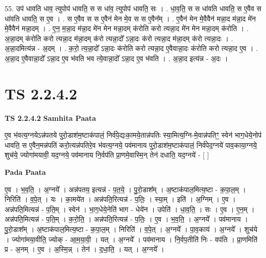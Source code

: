 \documentclass[17pt]{extarticle}
\begin{document}
55. उप॑ धावति धाव॒ त्युपोप॑ धावति॒ स स धा॑व॒ त्युपोप॑ धावति॒ सः । . धा॒व॒ति॒ स स धा॑वति धावति॒ स ए॒वैव स धा॑वति धावति॒ स ए॒व । . स ए॒वैव स स ए॒वैन॑ मेन मे॒व स स ए॒वैन᳚म् । . ए॒वैन॑ मेन मे॒वैवैन॑ मन्ना॒द म॑न्ना॒द मे॑न मे॒वैवैन॑ मन्ना॒दम् । . ए॒न॒ म॒न्ना॒द म॑न्ना॒द मे॑न मेन मन्ना॒दम् क॑रोति करो त्यन्ना॒द मे॑न मेन मन्ना॒दम् क॑रोति । . अ॒न्ना॒दम् क॑रोति करो त्यन्ना॒द म॑न्ना॒दम् क॑रो त्यन्ना॒दो᳚ ऽन्ना॒दः क॑रो त्यन्ना॒द म॑न्ना॒दम् क॑रो त्यन्ना॒दः । . अ॒न्ना॒दमित्य॑न्न - अ॒दम् । . क॒रो॒ त्य॒न्ना॒दो᳚ ऽन्ना॒दः क॑रोति करो त्यन्ना॒द ए॒वैवान्ना॒दः क॑रोति करो त्यन्ना॒द ए॒व । . अ॒न्ना॒द ए॒वैवान्ना॒दो᳚ ऽन्ना॒द ए॒व भ॑वति भव त्ये॒वान्ना॒दो᳚ ऽन्ना॒द ए॒व भ॑वति । . अ॒न्ना॒द इत्य॑न्न - अ॒दः । \newline
\pagebreak
{}

\section{ TS 2.2.4.2 }

\textbf{TS 2.2.4.2 } \newline
\textbf{Samhita Paata} \newline

ए॒व भ॑वत्य॒ग्नयेऽन्न॑पतये पुरो॒डाश॑म॒ष्टाक॑पालं॒ निर्व॑पे॒द्यःका॒मये॒तान्न॑पतिः स्या॒मित्य॒ग्नि-मे॒वान्न॑पतिꣳ॒॒ स्वेन॑ भाग॒धेये॒नोप॑ धावति॒ स ए॒वैन॒मन्न॑पतिं करो॒त्यन्न॑पतिरे॒व भ॑वत्य॒ग्नये॒ पव॑मानाय पुरो॒डाश॑म॒ष्टाक॑पालं॒ निर्व॑पेद॒ग्नये॑ पाव॒काया॒ग्नये॒ शुच॑ये॒ ज्योगा॑मयावी॒ यद॒ग्नये॒ पव॑मानाय नि॒र्वप॑ति प्रा॒णमे॒वास्मि॒न् तेन॑ दधाति॒ यद॒ग्नये॑ - [  ] \newline

\textbf{Pada Paata} \newline

ए॒व । भ॒व॒ति॒ । अ॒ग्नये᳚ । अन्न॑पतय॒ इत्यन्न॑ - प॒त॒ये॒ । पु॒रो॒डाश᳚म् । अ॒ष्टाक॑पाल॒मित्य॒ष्टा - क॒पा॒ल॒म् । निरिति॑ । व॒पे॒त् । यः । का॒मये॑त । अन्न॑पति॒रित्यन्न॑ - प॒तिः॒ । स्या॒म् । इति॑ । अ॒ग्निम् । ए॒व । अन्न॑पति॒मित्यन्न॑ - प॒ति॒म् । स्वेन॑ । भा॒ग॒धेये॒नेति॑ भाग - धेये॑न । उपेति॑ । धा॒व॒ति॒ । सः । ए॒व । ए॒न॒म् । अन्न॑पति॒मित्यन्न॑ - प॒ति॒म् । क॒रो॒ति॒ । अन्न॑पति॒रित्यन्न॑ - प॒तिः॒ । ए॒व । भ॒व॒ति॒ । अ॒ग्नये᳚ । पव॑मानाय । पु॒रो॒डाश᳚म् । अ॒ष्टाक॑पाल॒मित्य॒ष्टा - क॒पा॒ल॒म् । निरिति॑ । व॒पे॒त् । अ॒ग्नये᳚ । पा॒व॒काय॑ । अ॒ग्नये᳚ । शुच॑ये । ज्योगा॑मया॒वीति॒ ज्योक् - आ॒म॒या॒वी॒ । यत् । अ॒ग्नये᳚ । पव॑मानाय । नि॒र्वप॒तीति॑ निः - वप॑ति । प्रा॒णमिति॑ प्र - अ॒नम् । ए॒व । अ॒स्मि॒न्न् । तेन॑ । द॒धा॒ति॒ । यत् । अ॒ग्नये᳚ ।  \newline
\end{document}
